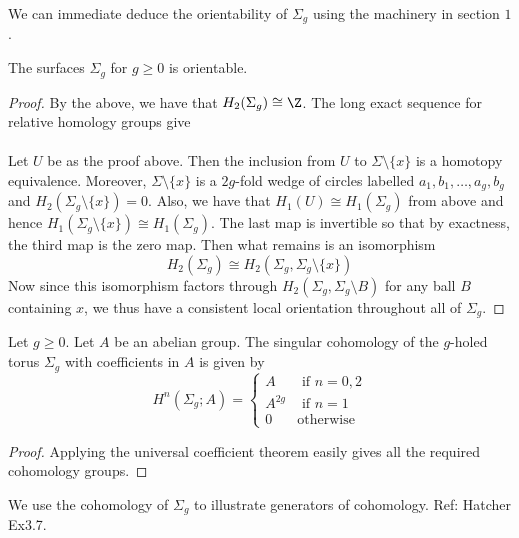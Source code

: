 \documentclass[a4paper]{article}
\begin{document}
We can immediate deduce the orientability of $\Sigma_g$ using the machinery in section $1$. 

\begin{crl}{}{} The surfaces $\Sigma_g$ for $g\geq 0$ is orientable. 
\begin{proof}
By the above, we have that $H_2(\Sigma_g)\cong\Z$. The long exact sequence for relative homology groups give \\
\\
Let $U$ be as the proof above. Then the inclusion from $U$ to $\Sigma\setminus\{x\}$ is a homotopy equivalence. Moreover, $\Sigma\setminus\{x\}$ is a $2g$-fold wedge of circles labelled $a_1,b_1,\dots,a_g,b_g$ and $H_2(\Sigma_g\setminus\{x\})=0$. Also, we have that $H_1(U)\cong H_1(\Sigma_g)$ from above and hence $H_1(\Sigma_g\setminus\{x\})\cong H_1(\Sigma_g)$. The last map is invertible so that by exactness, the third map is the zero map. Then what remains is an isomorphism $$H_2(\Sigma_g)\cong H_2(\Sigma_g,\Sigma_g\setminus\{x\})$$ Now since this isomorphism factors through $H_2(\Sigma_g,\Sigma_g\setminus B)$ for any ball $B$ containing $x$, we thus have a consistent local orientation throughout all of $\Sigma_g$. 
\end{proof}
\end{crl}

\begin{prp}{}{} Let $g\geq 0$. Let $A$ be an abelian group. The singular cohomology of the $g$-holed torus $\Sigma_g$ with coefficients in $A$ is given by $$H^n(\Sigma_g;A)=\begin{cases}
A & \text{ if } n=0,2\\
A^{2g} & \text{ if } n=1\\
0 & \text{otherwise}
\end{cases}$$ 
\begin{proof}
Applying the universal coefficient theorem easily gives all the required cohomology groups. 
\end{proof}
\end{prp}

We use the cohomology of $\Sigma_g$ to illustrate generators of cohomology. Ref: Hatcher Ex3.7. 
\end{document}

